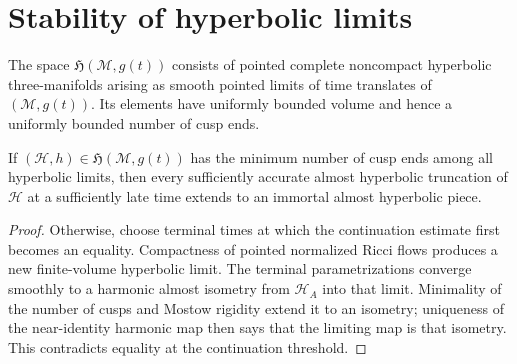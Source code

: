 \section{Stability of hyperbolic limits}

\begin{definition}
\label{def:chow-iv-space-hyperbolic-limits}

The space \(\mathfrak H(\mathcal M,g(t))\) consists of pointed complete
noncompact hyperbolic three-manifolds arising as smooth pointed limits of time
translates of \((\mathcal M,g(t))\).  Its elements have uniformly bounded
volume and hence a uniformly bounded number of cusp ends.
\end{definition}

\begin{proposition}
\label{prop:chow-iv-minimal-cusp-pieces-immortal}


If \((\mathcal H,h)\in\mathfrak H(\mathcal M,g(t))\) has the minimum number
of cusp ends among all hyperbolic limits, then every sufficiently accurate
almost hyperbolic truncation of \(\mathcal H\) at a sufficiently late time
extends to an immortal almost hyperbolic piece.
\end{proposition}

\begin{proof}
\sketch
Otherwise, choose terminal times at which the continuation estimate first
becomes an equality.  Compactness of pointed normalized Ricci flows produces a
new finite-volume hyperbolic limit.  The terminal parametrizations converge
smoothly to a harmonic almost isometry from \(\mathcal H_A\) into that limit.
Minimality of the number of cusps and Mostow rigidity extend it to an isometry;
uniqueness of the near-identity harmonic map then says that the limiting map is
that isometry.  This contradicts equality at the continuation threshold.
\end{proof}

